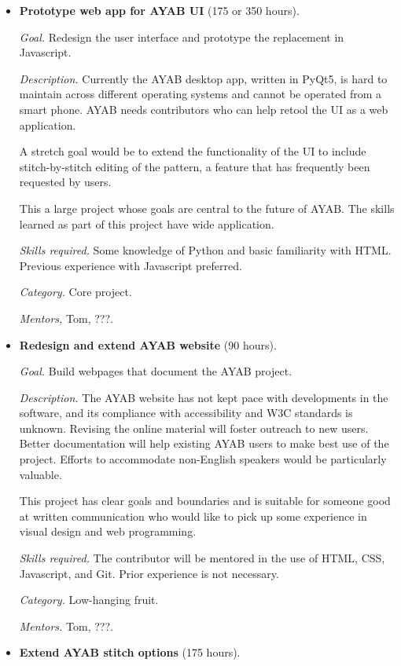 \documentclass{article}
\begin{document}
\begin{itemize}
\item \textbf{Prototype web app for AYAB UI} (175 or 350 hours). 

\textit{Goal.} Redesign the user interface and prototype the replacement in Javascript.

\textit{Description.} Currently the AYAB desktop app, written in PyQt5, is hard to maintain across different operating systems and cannot be operated from a smart phone. AYAB needs contributors who can help retool the UI as a web application. 

A stretch goal would be to extend the functionality of the UI to include stitch-by-stitch editing of the pattern, a feature that has frequently been requested by users.

This a large project whose goals are central to the future of AYAB. The skills learned as part of this project have wide application.

\textit{Skills required.} Some knowledge of Python and basic familiarity with HTML. Previous experience with Javascript preferred.

\textit{Category.} Core project. 

\textit{Mentors,} Tom, ???.


\item \textbf{Redesign and extend AYAB website} (90 hours). 

\textit{Goal.} Build webpages that document the AYAB project. 

\textit{Description.} The AYAB website has not kept pace with developments in the software, and its compliance with accessibility and W3C standards is unknown. Revising the online material will foster outreach to new users. Better documentation will help existing AYAB users to make best use of the project. Efforts to accommodate non-English speakers would be particularly valuable. 

This project has clear goals and boundaries and is suitable for someone good at written communication who would like to pick up some experience in visual design and web programming.

\textit{Skills required.} The contributor will be mentored in the use of HTML, CSS, Javascript, and Git. Prior experience is not necessary.

\textit{Category.} Low-hanging fruit. 

\textit{Mentors.} Tom, ???.


\item \textbf{Extend AYAB stitch options} (175 hours). 


\end{itemize}
\end{document}
